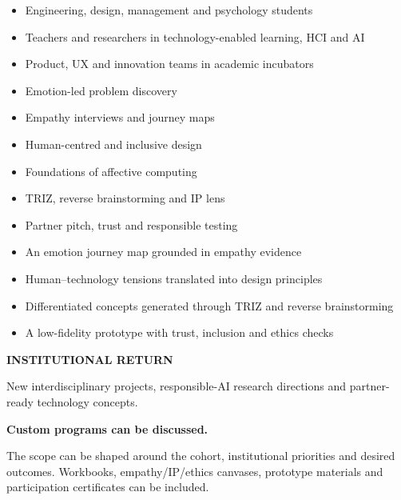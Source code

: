 \begin{minipage}[t]{0.36\textwidth}
  \vspace{0pt}
  \begin{brochurecard}[colback=Accent!5!white]
    \begin{itemize}
      \item Engineering, design, management and psychology students
      \item Teachers and researchers in technology-enabled learning, HCI and AI
      \item Product, UX and innovation teams in academic incubators
    \end{itemize}
  \end{brochurecard}

  \begin{brochurecard}
    \begin{itemize}
      \item Emotion-led problem discovery
      \item Empathy interviews and journey maps
      \item Human-centred and inclusive design
      \item Foundations of affective computing
      \item TRIZ, reverse brainstorming and IP lens
      \item Partner pitch, trust and responsible testing
    \end{itemize}
  \end{brochurecard}

  \begin{brochurecard}[colback=Accent!3!white]
    \begin{itemize}
      \item An emotion journey map grounded in empathy evidence
      \item Human--technology tensions translated into design principles
      \item Differentiated concepts generated through TRIZ and reverse brainstorming
      \item A low-fidelity prototype with trust, inclusion and ethics checks
    \end{itemize}
    {\color{Accent}\bfseries\fontsize{6.6}{7.2}\selectfont INSTITUTIONAL RETURN}\par
    New interdisciplinary projects, responsible-AI research directions and partner-ready technology concepts.
  \end{brochurecard}

  \begin{customprogramcard}
    {\bfseries Custom programs can be discussed.}\par
    The scope can be shaped around the cohort, institutional priorities and desired outcomes.
    Workbooks, empathy/IP/ethics canvases, prototype materials and participation certificates can be included.
  \end{customprogramcard}
\end{minipage}

\Footer
